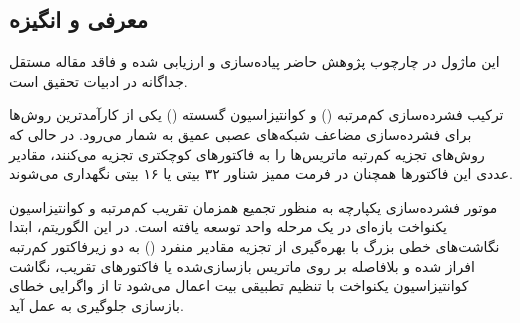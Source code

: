 \subsection{معرفی و انگیزه}
این ماژول در چارچوب پژوهش حاضر پیاده‌سازی و ارزیابی شده و فاقد مقاله مستقل جداگانه در ادبیات تحقیق است.

ترکیب فشرده‌سازی کم‌مرتبه () و کوانتیزاسیون گسسته () یکی از کارآمدترین روش‌ها برای فشرده‌سازی مضاعف شبکه‌های عصبی عمیق به شمار می‌رود. در حالی که روش‌های تجزیه کم‌رتبه ماتریس‌ها را به فاکتورهای کوچکتری تجزیه می‌کنند، مقادیر عددی این فاکتورها همچنان در فرمت ممیز شناور ۳۲ بیتی یا ۱۶ بیتی نگهداری می‌شوند.

موتور فشرده‌سازی یکپارچه  به منظور تجمیع همزمان تقریب کم‌مرتبه و کوانتیزاسیون یکنواخت بازه‌ای در یک مرحله واحد توسعه یافته است. در این الگوریتم، ابتدا نگاشت‌های خطی بزرگ با بهره‌گیری از تجزیه مقادیر منفرد () به دو زیرفاکتور کم‌رتبه افراز شده و بلافاصله بر روی ماتریس بازسازی‌شده یا فاکتورهای تقریب، نگاشت کوانتیزاسیون یکنواخت با تنظیم تطبیقی بیت اعمال می‌شود تا از واگرایی خطای بازسازی جلوگیری به عمل آید.
